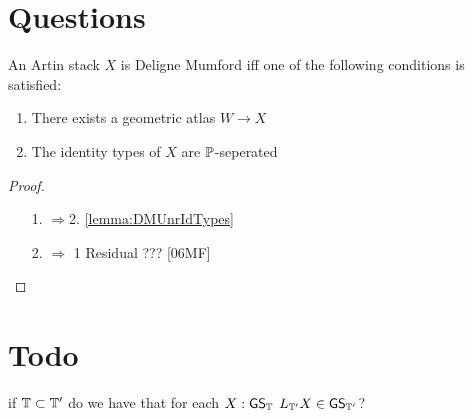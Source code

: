 \documentclass{article}
\renewcommand{\GS}{\mathsf{GS}}
\begin{document}
\section{Questions}
\begin{theorem}[TODO]
	An Artin stack $X$ is Deligne Mumford iff one of the following conditions is satisfied:
	\begin{enumerate}
		\item There exists a geometric atlas $W \to X$
		\item The identity types of $X$ are $\mathbb{P}$-seperated
	\end{enumerate}
\end{theorem}
\begin{proof}
	\begin{enumerate}
		\item [1. $\Rightarrow $2.] \ref{lemma:DMUnrIdTypes}
		\item [2. $\Rightarrow$ 1] Residual ??? [06MF]
	\end{enumerate}
\end{proof}
\section{Todo}

\begin{question}
	if $\mathbb{T} \subset \mathbb{T}'$ do we have that for each $X : \GS_\bT$ $L_{\bT'} X \in \GS_{\bT'}$?
\end{question}

\begin{question}
	
\end{question}
\end{document}
